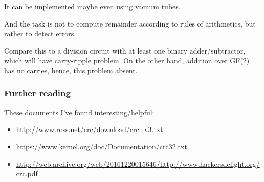 It can be implemented maybe even using vacuum tubes.

And the task is not to compute remainder according to rules of arithmetics, but rather to detect errors.

Compare this to a division circuit with at least one binary adder/subtractor, which will have carry-ripple problem.
On the other hand, addition over GF(2) has no carries, hence, this problem absent.

\subsubsection{Further reading}

These documents I've found interesting/helpful:

\begin{itemize}

\item \url{http://www.ross.net/crc/download/crc_v3.txt}
\item \url{https://www.kernel.org/doc/Documentation/crc32.txt}
\item \url{http://web.archive.org/web/20161220015646/http://www.hackersdelight.org/crc.pdf}

\end{itemize}

